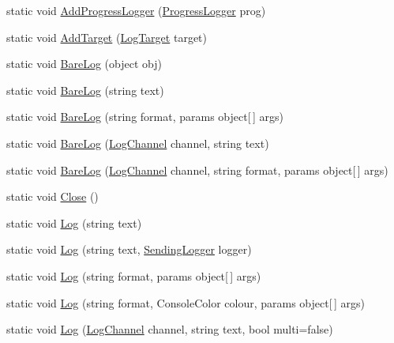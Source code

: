 \begin{DoxyCompactItemize}
\item 
static void \hyperlink{classOTA_1_1Logging_1_1ProgramLog_a7e057bd5832f68de6a907bdef159f18f}{Add\+Progress\+Logger} (\hyperlink{classOTA_1_1Logging_1_1ProgressLogger}{Progress\+Logger} prog)
\item 
static void \hyperlink{classOTA_1_1Logging_1_1ProgramLog_af916dc7b5cebbb06e126a842d09ebf56}{Add\+Target} (\hyperlink{classOTA_1_1Logging_1_1LogTarget}{Log\+Target} target)
\item 
static void \hyperlink{classOTA_1_1Logging_1_1ProgramLog_a9ee08d11d1f94b9048593d9b5704caee}{Bare\+Log} (object obj)
\item 
static void \hyperlink{classOTA_1_1Logging_1_1ProgramLog_a5f5fe8c256b4ecbee29a50f6ea4aaeac}{Bare\+Log} (string text)
\item 
static void \hyperlink{classOTA_1_1Logging_1_1ProgramLog_a5485b604a1e343adb5bc2a3958792dfa}{Bare\+Log} (string format, params object\mbox{[}$\,$\mbox{]} args)
\item 
static void \hyperlink{classOTA_1_1Logging_1_1ProgramLog_af561c8fded9584a6651fcbca9386e984}{Bare\+Log} (\hyperlink{classOTA_1_1Logging_1_1LogChannel}{Log\+Channel} channel, string text)
\item 
static void \hyperlink{classOTA_1_1Logging_1_1ProgramLog_a11f2e900324e2175bc55b1d3a9df81a6}{Bare\+Log} (\hyperlink{classOTA_1_1Logging_1_1LogChannel}{Log\+Channel} channel, string format, params object\mbox{[}$\,$\mbox{]} args)
\item 
static void \hyperlink{classOTA_1_1Logging_1_1ProgramLog_afd8acd145096a4c6bf37a4c0ef1b91d0}{Close} ()
\item 
static void \hyperlink{classOTA_1_1Logging_1_1ProgramLog_ac719c57e79271a9d754a61b94608945a}{Log} (string text)
\item 
static void \hyperlink{classOTA_1_1Logging_1_1ProgramLog_aad067d87a7d02a41d4a4b73c86bd6c4d}{Log} (string text, \hyperlink{namespaceOTA_1_1Logging_a489c780cb72d9452216c06b7a0eec2a6}{Sending\+Logger} logger)
\item 
static void \hyperlink{classOTA_1_1Logging_1_1ProgramLog_a4daa1ee6b325b798ee1c2a62ce4447ba}{Log} (string format, params object\mbox{[}$\,$\mbox{]} args)
\item 
static void \hyperlink{classOTA_1_1Logging_1_1ProgramLog_a321b47feebe98199b3c909a168c8aaed}{Log} (string format, Console\+Color colour, params object\mbox{[}$\,$\mbox{]} args)
\item 
static void \hyperlink{classOTA_1_1Logging_1_1ProgramLog_a97671670d0fa97d5d5675609c8b3564a}{Log} (\hyperlink{classOTA_1_1Logging_1_1LogChannel}{Log\+Channel} channel, string text, bool multi=false)

\end{DoxyCompactItemize}
